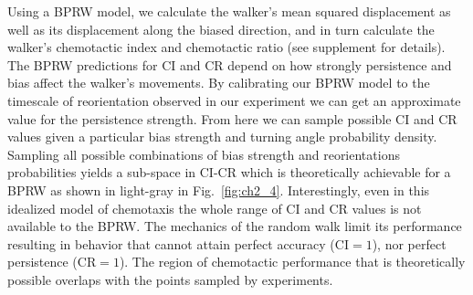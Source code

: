 Using a BPRW model, we calculate the walker's mean squared displacement as well as its displacement along the biased direction, and in turn calculate the walker's chemotactic index and chemotactic ratio (see supplement for details). The BPRW predictions for CI and CR depend on how strongly persistence and bias affect the walker's movements. By calibrating our BPRW model to the timescale of reorientation observed in our experiment we can get an approximate value for the persistence strength. From here we can sample possible CI and CR values given a particular bias strength and turning angle probability density. Sampling all possible combinations of bias strength and reorientations probabilities yields a sub-space in CI-CR which is theoretically achievable for a BPRW as shown in light-gray in Fig.\ \ref{fig:ch2_4}. Interestingly, even in this idealized model of chemotaxis the whole range of CI and CR values is not available to the BPRW.
The mechanics of the random walk limit its performance resulting in behavior that cannot attain perfect accuracy ($\text{CI}=1$), nor perfect persistence ($\text{CR}=1$).
The region of chemotactic performance that is theoretically possible overlaps with the points sampled by experiments.



